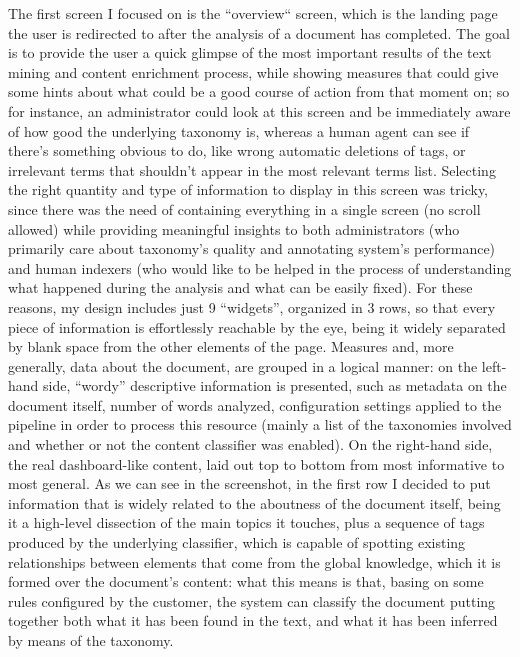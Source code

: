 \documentclass[12pt,svgnames]{memoir}
\begin{document}
The first screen I focused on is the ``overview`` screen, which is the
landing page the user is redirected to after the analysis of a document
has completed. The goal is to provide the user a quick glimpse of the
most important results of the text mining and content enrichment
process, while showing measures that could give some hints about what
could be a good course of action from that moment on; so for instance,
an administrator could look at this screen and be immediately aware of
how good the underlying taxonomy is, whereas a human agent can see if
there's something obvious to do, like wrong automatic deletions of tags,
or irrelevant terms that shouldn't appear in the most relevant terms
list. Selecting the right quantity and type of information to display in
this screen was tricky, since there was the need of containing
everything in a single screen (no scroll allowed) while providing
meaningful insights to both administrators (who primarily care about
taxonomy's quality and annotating system's performance) and human
indexers (who would like to be helped in the process of understanding
what happened during the analysis and what can be easily fixed). For
these reasons, my design includes just 9 ``widgets'', organized in 3
rows, so that every piece of information is effortlessly reachable by
the eye, being it widely separated by blank space from the other
elements of the page. Measures and, more generally, data about the
document, are grouped in a logical manner: on the left-hand side,
``wordy'' descriptive information is presented, such as metadata on the
document itself, number of words analyzed, configuration settings
applied to the pipeline in order to process this resource (mainly a list
of the taxonomies involved and whether or not the content classifier was
enabled). On the right-hand side, the real dashboard-like content, laid
out top to bottom from most informative to most general. As we can see
in the screenshot, in the first row I decided to put information that is
widely related to the aboutness of the document itself, being it a
high-level dissection of the main topics it touches, plus a sequence of
tags produced by the underlying classifier, which is capable of spotting
existing relationships between elements that come from the global
knowledge, which it is formed over the document's content: what this
means is that, basing on some rules configured by the customer, the
system can classify the document putting together both what it has been
found in the text, and what it has been inferred by means of the
taxonomy.
\end{document}
